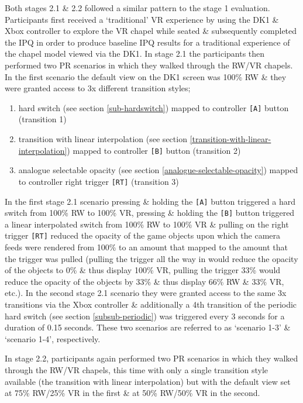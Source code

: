 Both stages 2.1 \& 2.2 followed a similar pattern to the stage 1 evaluation. Participants first received a `traditional' VR experience by using the DK1 \& Xbox controller to explore the VR chapel while seated \& subsequently completed the IPQ in order to produce baseline IPQ results for a traditional experience of the chapel model viewed via the DK1. In stage 2.1 the participants then performed two PR scenarios in which they walked through the RW/VR chapels. In the first scenario the default view on the DK1 screen was 100\% RW \& they were granted access to 3x different transition styles;

\begin{enumerate}
	\item hard switch (see section \ref{sub-hardswitch}) mapped to controller \texttt{[A]} button (transition 1)
	\item transition with linear interpolation (see section \ref{transition-with-linear-interpolation}) mapped to controller \texttt{[B]} button (transition 2)
	\item analogue selectable opacity (see section \ref{analogue-selectable-opacity}) mapped to controller right trigger \texttt{[RT]} (transition 3)
\end{enumerate}

In the first stage 2.1 scenario pressing \& holding the \texttt{[A]} button triggered a hard switch from 100\% RW to 100\% VR, pressing \& holding the \texttt{[B]} button triggered a linear interpolated switch from 100\% RW to 100\% VR \& pulling on the right trigger \texttt{[RT]} reduced the opacity of the game objects upon which the camera feeds were rendered from 100\% to an amount that mapped to the amount that the trigger was pulled (pulling the trigger all the way in would reduce the opacity of the objects to 0\% \& thus display 100\% VR, pulling the trigger 33\% would reduce the opacity of the objects by 33\% \& thus display 66\% RW \& 33\% VR, etc.). In the second stage 2.1 scenario they were granted access to the same 3x transitions via the Xbox controller \& additionally a 4th transition of the periodic hard switch (see section \ref{subsub-periodic}) was triggered every 3 seconds for a duration of 0.15 seconds. These two scenarios are referred to as `scenario 1-3' \& `scenario 1-4', respectively.

In stage 2.2, participants again performed two PR scenarios in which they walked through the RW/VR chapels, this time with only a single transition style available (the transition with linear interpolation) but with the default view set at 75\% RW/25\% VR in the first \& at 50\% RW/50\% VR in the second.

